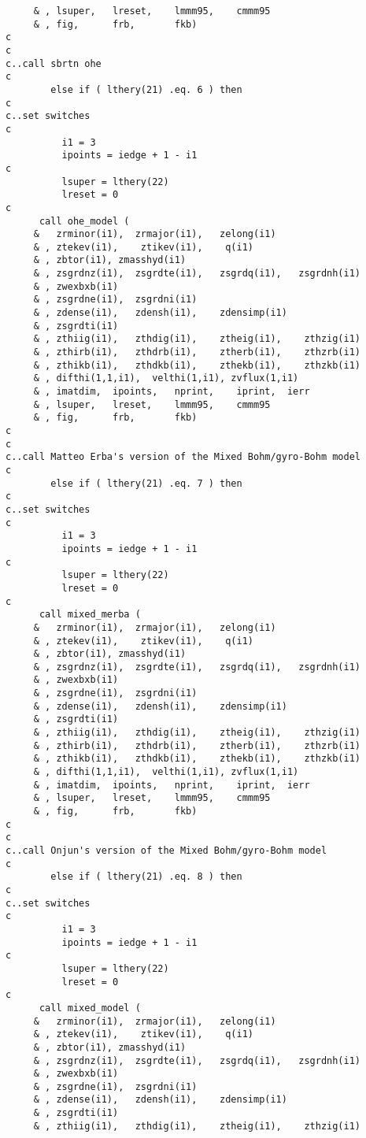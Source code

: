\begin{verbatim}
     & , lsuper,   lreset,    lmmm95,    cmmm95
     & , fig,      frb,       fkb)
c
c
c..call sbrtn ohe
c
        else if ( lthery(21) .eq. 6 ) then
c
c..set switches
c
          i1 = 3
          ipoints = iedge + 1 - i1
c
          lsuper = lthery(22)
          lreset = 0
c
      call ohe_model (
     &   zrminor(i1),  zrmajor(i1),   zelong(i1)    
     & , ztekev(i1),    ztikev(i1),    q(i1)
     & , zbtor(i1), zmasshyd(i1)
     & , zsgrdnz(i1),  zsgrdte(i1),   zsgrdq(i1),   zsgrdnh(i1)    
     & , zwexbxb(i1)
     & , zsgrdne(i1),  zsgrdni(i1)
     & , zdense(i1),   zdensh(i1),    zdensimp(i1)
     & , zsgrdti(i1)
     & , zthiig(i1),   zthdig(i1),    ztheig(i1),    zthzig(i1)
     & , zthirb(i1),   zthdrb(i1),    ztherb(i1),    zthzrb(i1)
     & , zthikb(i1),   zthdkb(i1),    zthekb(i1),    zthzkb(i1)
     & , difthi(1,1,i1),  velthi(1,i1), zvflux(1,i1)
     & , imatdim,  ipoints,   nprint,    iprint,  ierr
     & , lsuper,   lreset,    lmmm95,    cmmm95 
     & , fig,      frb,       fkb)
c
c
c..call Matteo Erba's version of the Mixed Bohm/gyro-Bohm model
c
        else if ( lthery(21) .eq. 7 ) then
c
c..set switches
c
          i1 = 3
          ipoints = iedge + 1 - i1
c
          lsuper = lthery(22)
          lreset = 0
c
      call mixed_merba (
     &   zrminor(i1),  zrmajor(i1),   zelong(i1)    
     & , ztekev(i1),    ztikev(i1),    q(i1)
     & , zbtor(i1), zmasshyd(i1)
     & , zsgrdnz(i1),  zsgrdte(i1),   zsgrdq(i1),   zsgrdnh(i1)    
     & , zwexbxb(i1)
     & , zsgrdne(i1),  zsgrdni(i1)
     & , zdense(i1),   zdensh(i1),    zdensimp(i1)
     & , zsgrdti(i1)
     & , zthiig(i1),   zthdig(i1),    ztheig(i1),    zthzig(i1)
     & , zthirb(i1),   zthdrb(i1),    ztherb(i1),    zthzrb(i1)
     & , zthikb(i1),   zthdkb(i1),    zthekb(i1),    zthzkb(i1)
     & , difthi(1,1,i1),  velthi(1,i1), zvflux(1,i1)
     & , imatdim,  ipoints,   nprint,    iprint,  ierr
     & , lsuper,   lreset,    lmmm95,    cmmm95 
     & , fig,      frb,       fkb)
c
c
c..call Onjun's version of the Mixed Bohm/gyro-Bohm model
c
        else if ( lthery(21) .eq. 8 ) then
c
c..set switches
c
          i1 = 3
          ipoints = iedge + 1 - i1
c
          lsuper = lthery(22)
          lreset = 0
c
      call mixed_model (
     &   zrminor(i1),  zrmajor(i1),   zelong(i1)    
     & , ztekev(i1),    ztikev(i1),    q(i1)
     & , zbtor(i1), zmasshyd(i1)
     & , zsgrdnz(i1),  zsgrdte(i1),   zsgrdq(i1),   zsgrdnh(i1)    
     & , zwexbxb(i1)
     & , zsgrdne(i1),  zsgrdni(i1)
     & , zdense(i1),   zdensh(i1),    zdensimp(i1)
     & , zsgrdti(i1)
     & , zthiig(i1),   zthdig(i1),    ztheig(i1),    zthzig(i1)

\end{verbatim}
